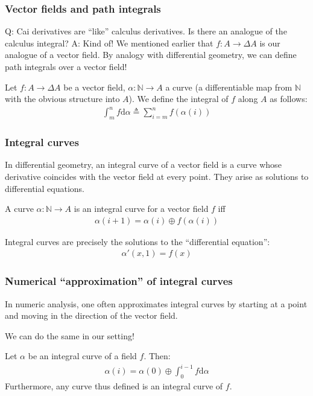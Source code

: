 \documentclass[english]{beamer}
\theoremstyle{plain}
\theoremstyle{remark}
\theoremstyle{remark}
\theoremstyle{remark}
\theoremstyle{definition}
\theoremstyle{definition}
\newcommand{\ra}[0]{\rightarrow}
\newcommand{\defeq}[0]{\triangleq}
\begin{document}
\begin{frame}
  \frametitle{Vector fields and path integrals}
  Q: Cai derivatives are ``like'' calculus derivatives. Is there an analogue of the calculus integral?
  A: Kind of!
  \vfill
  We mentioned earlier that $f : A \ra \Delta A$ is our analogue of a vector field. By analogy
  with differential geometry, we can define path integrals over a vector field!
  
  \begin{definition}
    Let $f : A \ra \Delta A$ be a vector field, $\alpha : \mathbb{N} \ra A$ a curve
    (a differentiable map from $\mathbb{N}$ with the obvious structure into $A$). We define the
    integral of $f$ along $A$ as follows:
    \begin{align*}
      \int_m^n f \text{d}\alpha \defeq \sum_{i = m}^n f(\alpha(i))
    \end{align*}
  \end{definition}
\end{frame}

\begin{frame}
  \frametitle{Integral curves}
  In differential geometry, an integral curve of a vector field is a curve whose derivative
  coincides with the vector field at every point. They arise as solutions to differential equations.
  \vfill
  \begin{definition}
    A curve $\alpha : \mathbb{N} \ra A$ is an integral curve for a vector field $f$ iff
    \begin{align*}
      \alpha(i + 1) = \alpha(i) \oplus f(\alpha(i))
    \end{align*}

  \end{definition}
  \begin{lemma}
    Integral curves are precisely the solutions to the ``differential equation'':
    \begin{align*}
      \alpha'(x, 1) = f(x)
    \end{align*}
  \end{lemma}
\end{frame}

\begin{frame}
  \frametitle{Numerical ``approximation'' of integral curves}
  In numeric analysis, one often approximates integral curves by starting at a point and moving
  in the direction of the vector field.

  We can do the same in our setting!
  \begin{lemma}
    Let $\alpha$ be an integral curve of a field $f$. Then:
    \begin{align*}
      \alpha(i) = \alpha(0) \oplus \int_0^{i - 1}f \text{d}\alpha
    \end{align*}
    Furthermore, any curve thus defined is an integral curve of $f$.
  \end{lemma}


\end{frame}
\end{document}
